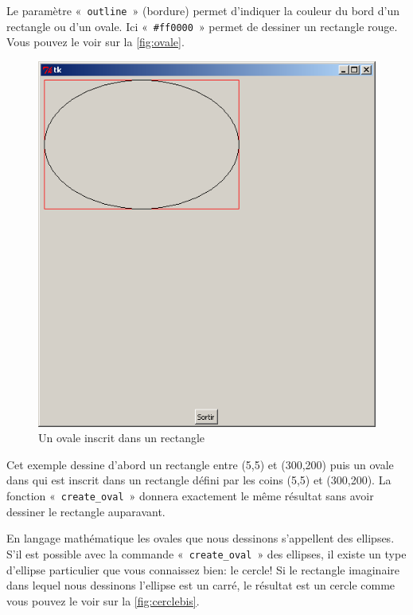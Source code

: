 Le paramètre « \texttt{outline} » (bordure) permet d'indiquer la couleur du bord d'un rectangle ou d'un ovale.
Ici « \texttt{\#ff0000} » permet de dessiner un rectangle rouge. Vous pouvez le voir sur la \autoref{fig:ovale}.

\begin{figure}[h!]
\centering
\includegraphics[scale=0.4]{images/ovale}
\caption{Un ovale inscrit dans un rectangle}\label{fig:ovale}
\end{figure}

Cet exemple dessine d'abord un rectangle entre (5,5) et (300,200) puis un ovale dans qui est inscrit dans un rectangle défini par les coins (5,5) et (300,200). La fonction « \texttt{create\_oval} » donnera exactement le même résultat sans avoir dessiner le rectangle auparavant.

En langage mathématique les ovales que nous dessinons s'appellent des ellipses.
S'il est possible avec la commande « \texttt{create\_oval} »  des ellipses, il existe un type d'ellipse particulier que vous connaissez bien: le cercle!  Si le rectangle imaginaire dans lequel nous dessinons l'ellipse est un carré, le résultat est un cercle comme vous pouvez le voir sur la \autoref{fig:cerclebis}.

